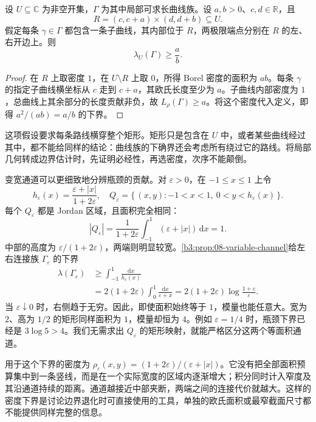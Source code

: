\begin{proposition}[必经矩形的密度下界]\label{b3:prop:08-bottleneck-density}
设 \(U\subseteq\mathbb C\) 为非空开集，\(\Gamma\) 为其中局部可求长曲线族。设 \(a,b>0\)、\(c,d\in\mathbb R\)，且
\[
 R=(c,c+a)\times(d,d+b)\subseteq U.
\]
假定每条 \(\gamma\in\Gamma\) 都包含一条子曲线，其内部位于 \(R\)，两极限端点分别在 \(R\) 的左、右开边上。则
\[
 \lambda_U(\Gamma)\ge\frac ab.
\]
\end{proposition}
\begin{proof}
在 \(R\) 上取密度 \(1\)，在 \(U\setminus R\) 上取 \(0\)，所得 Borel 密度的面积为 \(ab\)。每条 \(\gamma\) 的指定子曲线横坐标从 \(c\) 走到 \(c+a\)，其欧氏长度至少为 \(a\)。子曲线内部密度为 \(1\)，总曲线上其余部分的长度贡献非负，故 \(L_\rho(\Gamma)\ge a\)。将这个密度代入定义，即得 \(a^2/(ab)=a/b\) 的下界。
\end{proof}

这项假设要求每条路线横穿整个矩形。矩形只是包含在 \(U\) 中，或者某些曲线经过其中，都不能给同样的结论：曲线族的下确界还会考虑所有绕过它的路线。将局部几何转成边界估计时，先证明必经性，再选密度，次序不能颠倒。

\ProseParagraphBreak
变宽通道可以更细致地分辨瓶颈的贡献。对 \(\varepsilon>0\)，在 \(-1\le x\le1\) 上令
\[
 h_\varepsilon(x)=\frac{\varepsilon+|x|}{1+2\varepsilon},\quad
 Q_\varepsilon=\{\,(x,y):-1<x<1,\ 0<y<h_\varepsilon(x)\,\}.
\]
每个 \(Q_\varepsilon\) 都是 Jordan 区域，且面积完全相同：
\[
 |Q_\varepsilon|
 =\frac1{1+2\varepsilon}\int_{-1}^{1}(\varepsilon+|x|)\,\mathrm dx=1.
\]
中部的高度为 \(\varepsilon/(1+2\varepsilon)\)，两端则明显较宽。\cref{b3:prop:08-variable-channel}给左右连接族 \(\Gamma_\varepsilon\) 的下界
\[
 \begin{aligned}
 \lambda(\Gamma_\varepsilon)
 &\ge\int_{-1}^{1}\frac{\mathrm dx}{h_\varepsilon(x)}\\
 &=2(1+2\varepsilon)\int_0^1\frac{\mathrm dx}{\varepsilon+x}
 =2(1+2\varepsilon)\log\frac{1+\varepsilon}{\varepsilon}.
 \end{aligned}
\]
当 \(\varepsilon\downarrow0\) 时，右侧趋于无穷。因此，即使面积始终等于 \(1\)，模量也能任意大。宽为 \(2\)、高为 \(1/2\) 的矩形同样面积为 \(1\)，模量却恒为 \(4\)。例如 \(\varepsilon=1/4\) 时，瓶颈下界已经是 \(3\log5>4\)。我们无需求出 \(Q_\varepsilon\) 的矩形映射，就能严格区分这两个等面积通道。

\ProseParagraphBreak
用于这个下界的密度为 \(\rho_\varepsilon(x,y)=(1+2\varepsilon)/(\varepsilon+|x|)\)。它没有把全部面积预算集中到一条竖线，而是在一个实际宽度的区域内逐渐增大；积分同时计入窄度及其沿通道持续的距离。通道越接近中部夹断，两端之间的连接代价就越大。这样的密度下界是讨论边界退化时可直接使用的工具，单独的欧氏面积或最窄截面尺寸都不能提供同样完整的信息。


